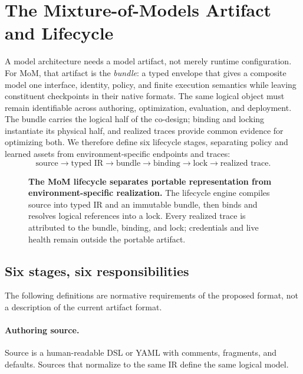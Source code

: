 \section{The Mixture-of-Models Artifact and Lifecycle}
\label{sec:artifact}

A model architecture needs a model artifact, not merely runtime configuration.
For MoM, that artifact is the \emph{bundle}: a typed envelope that gives a
composite model one interface, identity, policy, and finite execution semantics
while leaving constituent checkpoints in their native formats. The same logical
object must remain identifiable across authoring, optimization, evaluation, and
deployment. The bundle carries the logical half of the co-design; binding and
locking instantiate its physical half, and realized traces provide common
evidence for optimizing both. We therefore define six lifecycle stages, separating policy and
learned assets from environment-specific endpoints and traces:
\begin{equation}
 \text{source}\rightarrow\text{typed IR}\rightarrow\text{bundle}
 \rightarrow\text{binding}\rightarrow\text{lock}
 \rightarrow\text{realized trace}.
 \label{eq:artifact-pipeline}
\end{equation}

\begin{figure}[H]
  \centering
  \resizebox{\linewidth}{!}{}
  \caption{\textbf{The MoM lifecycle separates portable representation
  from environment-specific realization.} The lifecycle engine compiles source into
  typed IR and an immutable bundle, then binds and resolves logical references
  into a lock. Every realized trace is attributed to the
  bundle, binding, and lock; credentials and live health remain outside the
  portable artifact.}
  \label{fig:artifact-lifecycle}
\end{figure}

\subsection{Six stages, six responsibilities}

The following definitions are normative requirements of the proposed format,
not a description of the current \vsr{} artifact format.

\paragraph{Authoring source.}
Source is a human-readable DSL or YAML with comments, fragments, and
defaults.  Sources that normalize to the same IR define the same logical model.

